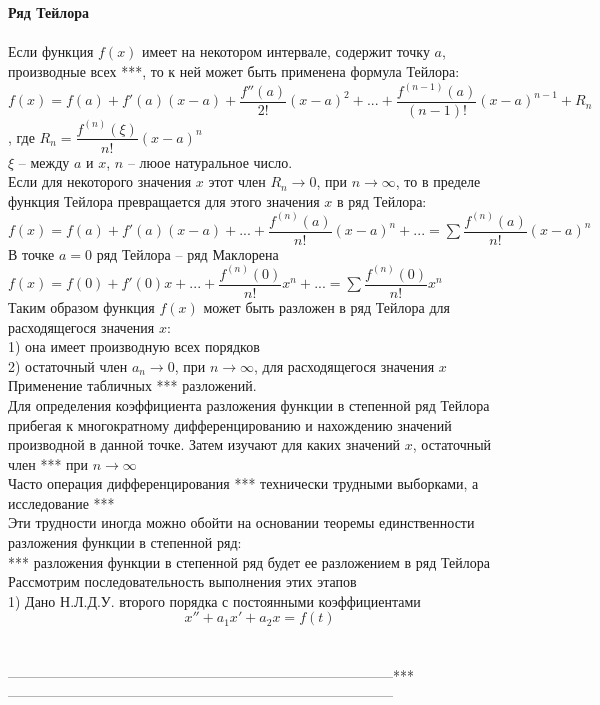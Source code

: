 \documentclass{article}
\numberwithin{equation}{section}
\begin{document}
\\\\
\textbf{Ряд Тейлора}
\\\\
Если функция $f(x)$ имеет на некотором интервале, содержит точку $a$, производные всех \colorbox{red!50}{***}, то к ней может быть применена формула Тейлора:\\
$f(x)=f(a)+f'(a)(x-a)+\dfrac{f''(a)}{2!}(x-a)^2+...+\dfrac{f^{(n-1)}(a)}{(n-1)!}(x-a)^{n-1}+R_n$, где $R_n=\dfrac{f^{(n)}(\xi)}{n!}(x-a)^{n}$\\
$\xi$ -- между $a$ и $x$, $n$ -- люое натуральное число.\\
Если для некоторого значения $x$ этот член $R_n\rightarrow0$, при $n\rightarrow\infty$, то в пределе функция Тейлора превращается для этого значения $x$ в ряд Тейлора:\\
$f(x)=f(a)+f'(a)(x-a)+...+\dfrac{f^{(n)}(a)}{n!}(x-a)^n+...=\sum\limits\dfrac{f^{(n)}(a)}{n!}(x-a)^n$\\
В точке $a=0$ ряд Тейлора -- ряд Маклорена\\
$f(x)=f(0)+f'(0)x+...+\dfrac{f^{(n)}(0)}{n!}x^n+...=\sum\dfrac{f^{(n)}(0)}{n!}x^n$\\
Таким образом функция $f(x)$ может быть разложен в ряд Тейлора для расходящегося значения $x$:\\
1) она имеет производную всех порядков\\
2) остаточный член $a_n\rightarrow0$, при $n\rightarrow\infty$, для расходящегося значения $x$\\
Применение табличных \colorbox{red!50}{***} разложений.\\
Для определения коэффициента разложения функции в степенной ряд Тейлора прибегая к многократному дифференцированию и нахождению значений производной в данной точке. Затем изучают для каких значений $x$, остаточный член \colorbox{red!50}{***} при $n\rightarrow\infty$\\
Часто операция дифференцирования \colorbox{red!50}{***} технически трудными выборками, а исследование \colorbox{red!50}{***}\\
Эти трудности иногда можно обойти на основании теоремы единственности разложения функции в степенной ряд:\\
\colorbox{red!50}{***} разложения функции в степенной ряд будет ее разложением в ряд Тейлора\\
Рассмотрим последовательность выполнения этих этапов\\
1) Дано Н.Л.Д.У. второго порядка с постоянными коэффициентами
\begin{equation}\label{e720000000000000000000000000000000000000000000000000}
x''+a_1x'+a_2x=f(t)
\end{equation}
\\\\-----------------------------------------------------------------------------------\colorbox{red!50}{***}-----------------------------------------------------------------------------------
\end{document}

